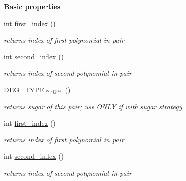 \begin{Indent}\textbf{ Basic properties}\par
\begin{DoxyCompactItemize}
\item 
\mbox{\label{group___g_b_computation_ac163e7707177e0c8566903ffdedea821}} 
int \hyperlink{group___g_b_computation_ac163e7707177e0c8566903ffdedea821}{first\+\_\+index} ()
\begin{DoxyCompactList}\small\item\em returns index of first polynomial in pair \end{DoxyCompactList}\item 
\mbox{\label{group___g_b_computation_a201f10149987060902a3999e4db201b9}} 
int \hyperlink{group___g_b_computation_a201f10149987060902a3999e4db201b9}{second\+\_\+index} ()
\begin{DoxyCompactList}\small\item\em returns index of second polynomial in pair \end{DoxyCompactList}\item 
\mbox{\label{group___g_b_computation_a85d34fcde810b942744433d1311ac331}} 
D\+E\+G\+\_\+\+T\+Y\+PE \hyperlink{group___g_b_computation_a85d34fcde810b942744433d1311ac331}{sugar} ()
\begin{DoxyCompactList}\small\item\em returns sugar of this pair; use O\+N\+LY if with sugar strategy \end{DoxyCompactList}\item 
\mbox{\label{group___g_b_computation_ac163e7707177e0c8566903ffdedea821}} 
int \hyperlink{group___g_b_computation_ac163e7707177e0c8566903ffdedea821}{first\+\_\+index} ()
\begin{DoxyCompactList}\small\item\em returns index of first polynomial in pair \end{DoxyCompactList}\item 
\mbox{\label{group___g_b_computation_a201f10149987060902a3999e4db201b9}} 
int \hyperlink{group___g_b_computation_a201f10149987060902a3999e4db201b9}{second\+\_\+index} ()
\begin{DoxyCompactList}\small\item\em returns index of second polynomial in pair \end{DoxyCompactList}\item 

\end{DoxyCompactItemize}
\end{Indent}
